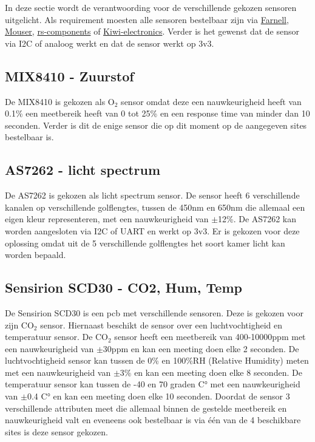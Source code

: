 In deze sectie wordt de verantwoording voor de verschillende gekozen sensoren uitgelicht. Als requirement moesten alle sensoren bestelbaar zijn via \href{https://nl.farnell.com}{Farnell}, \href{https://nl.mouser.com}{Mouser}, \href{https://nl.rs-components.com}{rs-components} of \href{https://kiwi-electronics.nl}{Kiwi-electronics}. Verder is het gewenst dat de sensor via I2C of analoog werkt en dat de sensor werkt op 3v3. 

\subsection{MIX8410 - Zuurstof}
\label{sec:mix}
De MIX8410 is gekozen als O$_2$ sensor omdat deze een nauwkeurigheid heeft van 0.1\% een meetbereik heeft van 0 tot 25\% en een response time van minder dan 10 seconden. Verder is dit de enige sensor die op dit moment op de aangegeven sites bestelbaar is. 

\subsection{AS7262 - licht spectrum}
\label{sec:as}
De AS7262 is gekozen als licht spectrum sensor. De sensor heeft 6 verschillende kanalen op verschillende golflengtes, tussen de 450nm en 650nm die allemaal een eigen kleur representeren, met een nauwkeurigheid van $\pm$12\%. De AS7262 kan worden aangesloten via I2C of UART en werkt op 3v3. Er is gekozen voor deze oplossing omdat uit de 5 verschillende golflengtes het soort kamer licht kan worden bepaald. 

\subsection{Sensirion SCD30 - CO2, Hum, Temp}
\label{sec:SCD30}

De Sensirion SCD30 is een pcb met verschillende sensoren. Deze is gekozen voor zijn CO$_2$ sensor. Hiernaast beschikt de sensor over een luchtvochtigheid en temperatuur sensor. De CO$_2$ sensor heeft een meetbereik van 400-10000ppm met een nauwkeurigheid van $\pm$30ppm en kan een meeting doen elke 2 seconden. De luchtvochtigheid sensor kan tussen de 0\% en 100\%RH (Relative Humidity) meten met een nauwkeurigheid van $\pm$3\% en kan een meeting doen elke 8 seconden. De temperatuur sensor kan tussen de -40 en 70 graden C° met een nauwkeurigheid van $\pm$0.4 C° en kan een meeting doen elke 10 seconden. Doordat de sensor 3 verschillende attributen meet die allemaal binnen de gestelde meetbereik en nauwkeurigheid valt en eveneens ook bestelbaar is via één van de 4 beschikbare sites is deze sensor gekozen.\\

